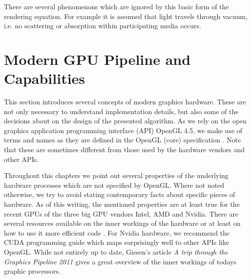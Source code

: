 \documentclass[thesis.tex]{subfiles}
\begin{document}
There are several phenomenons which are ignored by this basic form of the rendering equation.
For example it is assumed that light travels through vacuum, i.e. no scattering or absorption within participating media occurs.



\section{Modern GPU Pipeline and Capabilities}
This section introduces several concepts of modern graphics hardware.
These are not only necessary to understand implementation details, but also some of the decisions about on the design of the presented algorithm.
As we rely on the open graphics application programming interface (API) OpenGL 4.5, we make use of terms and names as they are defined in the OpenGL (core) specification \cite{bib:openglspec}.
Note that these are sometimes different from those used by the hardware vendors and other APIs.

Throughout this chapters we point out several properties of the underlying hardware processes which are not specified by OpenGL.
Where not noted otherwise, we try to avoid stating contemporary facts about specific pieces of hardware.
As of this writing, the mentioned properties are at least true for the recent GPUs of the three big GPU vendors Intel, AMD and Nvidia.
There are several resources available on the inner workings of the hardware or at least on how to use it more efficient code \cite{bib:intelhardwaredoc, bib:amdhardwaredoc}.
For Nvidia hardware, we recommend the CUDA programming guide \cite{bib:cudaprogguide} which maps surprisingly well to other APIs like OpenGL.
While not entirely up to date, Giesen's article \emph{A trip through the Graphics Pipeline 2011} \cite{bib:tripthroughgraphicspipe} gives a great overview of the inner workings of todays graphic processors.

\end{document}
